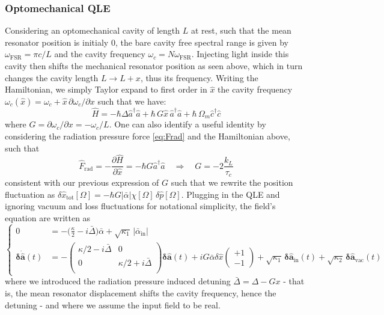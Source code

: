 \subsubsection{Optomechanical QLE}
Considering an optomechanical cavity of length $L$ at rest, such that the mean resonator position is initialy 0, the bare cavity free spectral range is given by $\omega_{\mathrm{FSR}}=\pi c /L$ and the cavity frequency $\omega_c = N \omega_{\mathrm{FSR}}$. Injecting light inside this cavity then shifts the mechanical resonator position as seen above, which in turn changes the cavity length $L \rightarrow L+x$, thus its frequency. Writing the Hamiltonian, we simply Taylor expand to first order in $\hat{x}$ the cavity frequency $\omega_c(\hat{x})=\omega_c + \hat x \, \partial \omega_c / \partial x$ such that we have: 
\begin{equation}
\hat{H} = - \hbar \Delta  \hat{a}^\dagger \hat{a} + \hbar \, G  \hat{x} \, \hat{a}^{\dagger} \hat{a} + \hbar \, \Omega_m \hat{c}^\dagger \hat{c}
\end{equation}
where $G=  \partial \omega_c / \partial x = - \omega_c/L$. One can also identify a useful identity by considering the radiation pressure force \eqref{eq:Frad} and the Hamiltonian above, such that
\begin{equation}
  \hat F_{\textrm{rad}} = - \frac{\partial \hat H}{\partial \hat x} = - \hbar G \hat{a}^\dagger \hat{a} \quad \Rightarrow \quad G = - 2 \frac{k_L}{\tau_c}
\end{equation}
consistent with our previous expression of $G$ such that we rewrite the position fluctuation as $\delta \hat x_{\mathrm{tot}} [\Omega]= - \hbar G |\bar \alpha| \chi[\Omega]\, \delta\hat p[\Omega]$. 
Plugging in the QLE and ignoring vacuum and loss fluctuations for notational simplicity, the field's equation are written as 
\begin{equation}
  \left\{
  \begin{split}
  0 &= -\Big(\frac{\kappa}{2}-i\bar\Delta\Big) \bar{\alpha} + \sqrt{\kappa_1} \, |\bar{\alpha}_{\mathrm{in}}| \\
  \mathbf{\delta \dot{\hat{a}}}(t)&= - \begin{pmatrix}
  \kappa/2-i\bar\Delta & 0 \\ 
   0 &\kappa/2+i\bar\Delta \\ 
  \end{pmatrix}  \mathbf{\delta \hat{a}}(t) + iG\bar{\alpha}\delta \hat{x} \begin{pmatrix} +1 \\ -1\end{pmatrix}  +  \sqrt{\kappa_{\mathrm{1}}} \, \mathbf{\delta \hat{a}_{\mathrm{in}}}(t)  + \sqrt{\kappa_2} \, \mathbf{\delta \hat{a}_{\mathrm{vac}}}(t) 
  \end{split}
  \right.
\end{equation}
where we introduced the radiation pressure induced detuning $\bar\Delta = \Delta - G x$ - that is, the mean resonator displacement shifts the cavity frequency, hence the detuning - and where we assume the input field to be real. 

